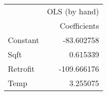 \begin{tabular}{lr}
\toprule
{} & OLS (by hand) \\
{} &  Coefficients \\
\midrule
Constant &    -83.602758 \\
Sqft     &      0.615339 \\
Retrofit &   -109.666176 \\
Temp     &      3.255075 \\
\bottomrule
\end{tabular}

